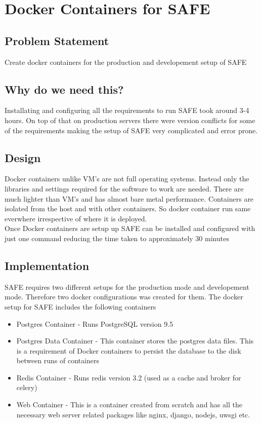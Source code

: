 \clearpage
\section{Docker Containers for SAFE} 
\hspace{0.5cm} 


\subsection{Problem Statement}
	Create docker containers for the production and developement setup of SAFE

\subsection{Why do we need this?}
	Installating and configuring all the requirements to run SAFE took around 3-4 hours. On top of that on production servers there were version conflicts for some of the requirements making the setup of SAFE very complicated and error prone. 

\subsection{Design}
	Docker containers unlike VM's are not full operating systems. Instead only the libraries and settings required for the software to work are needed. There are much lighter than VM's and has almost bare metal performance. Containers are isolated from the host and with other containers. So docker container run same everwhere irrespective of where it is deployed.\\

	Once Docker containers are setup up SAFE can be installed and configured with just one command reducing the time taken to approximately 30 minutes

\subsection{Implementation}
	SAFE requires two different setups for the production mode and developement mode. Therefore two docker configurations was created for them. The docker setup for SAFE includes the following containers

    \begin{itemize}
        \item Postgres Container - Runs PostgreSQL version 9.5
        \item Postgres Data Container - This container stores the postgres data files. This is a requirement of Docker containers to persist the database to the disk between runs of containers
        \item Redis Container - Runs redis version 3.2 (used as a cache and broker for celery)
        \item Web Container - This is a container created from scratch and has all the necessary web server related packages like nginx, django, nodejs, uwsgi etc.
	\end{itemize}
 
 	